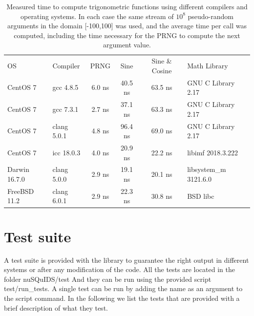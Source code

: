 \documentclass[3p,12pt]{elsarticle}
\newcommand{\ttf}{\ttfamily}
\begin{document}
\begin{table}
	\begin{tabular}{ llcccl }
		OS & Compiler & PRNG & Sine & Sine \& Cosine & Math Library \\
		CentOS 7 & gcc 4.8.5 & 6.0 ns & 40.5 ns & 63.5 ns & GNU C Library  2.17 \\
		CentOS 7 & gcc 7.3.1 & 2.7 ns & 37.1 ns & 63.3 ns & GNU C Library  2.17 \\
		CentOS 7 & clang 5.0.1 & 4.8 ns & 96.4 ns & 69.0 ns & GNU C Library  2.17 \\
		CentOS 7 & icc 18.0.3 & 4.0 ns & 20.9 ns & 22.2 ns & libimf 2018.3.222\\
		Darwin 16.7.0 & clang 5.0.0 & 2.9 ns & 19.1 ns & 20.1 ns & libsystem\_m  3121.6.0 \\
		FreeBSD 11.2 & clang 6.0.1 & 2.9 ns & 22.3 ns & 30.8 ns & BSD libc
	\end{tabular}
	\caption{
		Measured time to compute trigonometric functions using different compilers and operating systems. In each case the same stream of $10^8$ pseudo-random arguments in the domain [-100,100] was used, and the average time per call was computed, including the time necessary for the PRNG to compute the next argument value. 
	}
	\label{tab:trig_perf}
\end{table}

\section{Test suite}
\label{sec:tests}
A test suite is provided with the library to guarantee the right
output in different systems or after any modification of the
code. All the tests are located in the folder {\ttf nuSQuIDS/test}
And they can be run using the provided script {\ttf test/run\_tests}.
A single test can be run by adding the name as an argument to the script
command.
In the following we list the tests that are provided with a brief
description of what they test.
\end{document}
